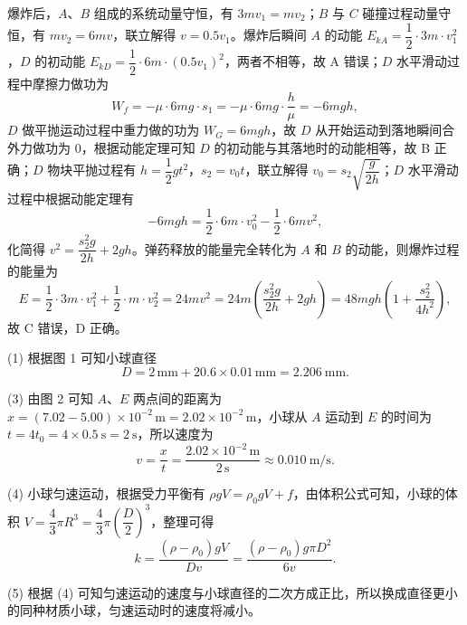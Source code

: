 \begin{answer}
爆炸后，$A$、$B$ 组成的系统动量守恒，有 $3mv_{1}=mv_{2}$；$B$ 与 $C$ 碰撞过程动量守恒，有 $mv_{2}=6mv$，联立解得 $v=0.5v_{1}$。爆炸后瞬间 $A$ 的动能 $E_{kA}=\dfrac{1}{2}\cdot3m\cdot v_{1}^{2}$，$D$ 的初动能 $E_{kD}=\dfrac{1}{2}\cdot6m\cdot(0.5v_{1})^{2}$，两者不相等，故 A 错误；$D$ 水平滑动过程中摩擦力做功为
\[
  W_{f}=-\mu\cdot6mg\cdot s_{1}=-\mu\cdot6mg\cdot\frac{h}{\mu}=-6mgh,
\]
$D$ 做平抛运动过程中重力做的功为 $W_{G}=6mgh$，故 $D$ 从开始运动到落地瞬间合外力做功为 0，根据动能定理可知 $D$ 的初动能与其落地时的动能相等，故 B 正确；$D$ 物块平抛过程有 $h=\dfrac{1}{2}gt^{2}$，$s_{2}=v_{0}t$，联立解得 $v_{0}=s_{2}\sqrt{\dfrac{g}{2h}}$；$D$ 水平滑动过程中根据动能定理有
\[
  -6mgh=\frac{1}{2}\cdot6m\cdot v_{0}^{2}-\frac{1}{2}\cdot6mv^{2},
\]
化简得 $v^{2}=\dfrac{s_{2}^{2}g}{2h}+2gh$。弹药释放的能量完全转化为 $A$ 和 $B$ 的动能，则爆炸过程的能量为
\[
  E=\frac{1}{2}\cdot3m\cdot v_{1}^{2}+\frac{1}{2}\cdot m\cdot v_{2}^{2}
    =24mv^{2}
    =24m\left(\frac{s_{2}^{2}g}{2h}+2gh\right)
    =48mgh\left(1+\frac{s_{2}^{2}}{4h^{2}}\right),
\]
故 C 错误，D 正确。
\end{answer}

\begin{answer}
(1) 根据图 1 可知小球直径
\[
  D=2\,\si{\milli\metre}+20.6\times0.01\,\si{\milli\metre}=\SI{2.206}{\milli\metre}.
\]

(3) 由图 2 可知 $A$、$E$ 两点间的距离为 $x=(7.02-5.00)\times10^{-2}\,\si{\metre}=2.02\times10^{-2}\,\si{\metre}$，小球从 $A$ 运动到 $E$ 的时间为 $t=4t_{0}=4\times\SI{0.5}{\second}=\SI{2}{\second}$，所以速度为
\[
  v=\frac{x}{t}=\frac{2.02\times10^{-2}\,\si{\metre}}{2\,\si{\second}}\approx\SI{0.010}{\metre\per\second}.
\]

(4) 小球匀速运动，根据受力平衡有 $\rho gV=\rho_{0}gV+f$，由体积公式可知，小球的体积 $V=\dfrac{4}{3}\pi R^{3}=\dfrac{4}{3}\pi\left(\dfrac{D}{2}\right)^{3}$，整理可得
\[
  k=\frac{(\rho-\rho_{0})gV}{Dv}=\frac{(\rho-\rho_{0})g\pi D^{2}}{6v}.
\]

(5) 根据 (4) 可知匀速运动的速度与小球直径的二次方成正比，所以换成直径更小的同种材质小球，匀速运动时的速度将减小。
\end{answer}

